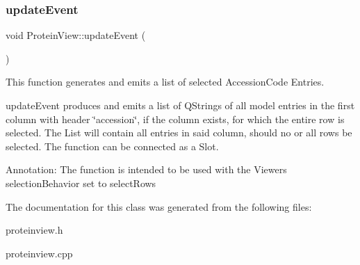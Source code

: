 \subsubsection{\texorpdfstring{update\+Event}{updateEvent}}
{\footnotesize\ttfamily void Protein\+View\+::update\+Event (\begin{DoxyParamCaption}{ }\end{DoxyParamCaption})\hspace{0.3cm}{\ttfamily [slot]}}



This function generates and emits a list of selected Accession\+Code Entries. 

update\+Event produces and emits a list of Q\+Strings of all model entries in the first column with header \char`\"{}accession\char`\"{}, if the column exists, for which the entire row is selected. The List will contain all entries in said column, should no or all rows be selected. The function can be connected as a Slot.

Annotation\+: The function is intended to be used with the Viewers selection\+Behavior set to select\+Rows 

The documentation for this class was generated from the following files\+:\begin{DoxyCompactItemize}
\item 
proteinview.\+h\item 
proteinview.\+cpp\end{DoxyCompactItemize}
